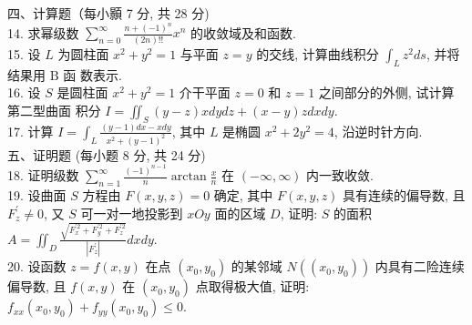 \documentclass[a4paper,11pt,UTF8]{article}
\begin{document}
四、计算题（每小顥 7 分, 共 28 分)\\
14. 求幂级数 $\displaystyle \sum_{n=0}^{\infty} \frac{n+(-1)^n}{(2 n) ! !} x^n$ 的收敛域及和函数.\\
15. 设 $L$ 为圆柱面 $x^2+y^2=1$ 与平面 $z=y$ 的交线, 计算曲线积分 $\displaystyle \int_L z^2 d s$, 并将结果用 $\mathrm{B}$ 函 数表示.\\
16. 设 $S$ 是圆柱面 $x^2+y^2=1$ 介干平面 $z=0$ 和 $z=1$ 之间部分的外侧, 试计算第二型曲面 积分 $\displaystyle I=\iint_S(y-z) x d y d z+(x-y) z d x d y$.\\
17. 计算 $\displaystyle I=\int_L \frac{(y-1) d x-x d y}{x^2+(y-1)^2}$, 其中 $L$ 是椭圆 $x^2+2 y^2=4$, 沿逆时针方向.\\
五、证明题 (每小题 8 分, 共 24 分)\\
18. 证明级数 $\displaystyle \sum_{n=1}^{\infty} \frac{(-1)^{n-1}}{n} \arctan \frac{x}{n}$ 在 $(-\infty, \infty)$ 内一致收敛.\\
19. 设曲面 $S$ 方程由 $F(x, y, z)=0$ 确定, 其中 $F(x, y, z)$ 具有连续的偏导数, 且 $F_z^{\prime} \neq 0$, 又 $S$ 可一对一地投影到 $x O y$ 面的区域 $D$, 证明: $S$ 的面积 $\displaystyle A=\iint_D \frac{\sqrt{F_x^{\prime 2}+F_y^{\prime 2}+F_z^{\prime 2}}}{\left|F_z^{\prime}\right|} d x d y$.\\
20. 设函数 $z=f(x, y)$ 在点 $\left(x_0, y_0\right)$ 的某邻域 $N\left(\left(x_0, y_0\right)\right)$ 内具有二险连续偏导数, 且 $f(x, y)$ 在 $\left(x_0, y_0\right)$ 点取得极大值, 证明: $f_{x x}\left(x_0, y_0\right)+f_{y y}\left(x_0, y_0\right) \leq 0$.\\
\end{document}
